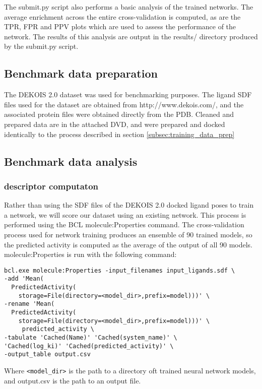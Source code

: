 The submit.py script also performs a basic analysis of the trained networks.
The average enrichment across the entire cross-validation is computed, as are the \ac{TPR}, \ac{FPR} and \ac{PPV} plots which are used to assess the performance of the network.
The results of this analysis are output in the results/ directory produced by the submit.py script.

\subsection{Benchmark data preparation}

The DEKOIS 2.0\citep{Bauer:2013de} dataset was used for benchmarking purposes.
The ligand \ac{SDF} files used for the dataset are obtained from http://www.dekois.com/, and the associated protein files were obtained directly from the \ac{PDB}. 
Cleaned and prepared data are in the attached DVD, and were prepared and docked identically to the process described in section \ref{subsec:training_data_prep}

\subsection{Benchmark data analysis}

\subsubsection{descriptor computaton}
Rather than using the \ac{SDF} files of the DEKOIS 2.0 docked ligand poses to train a network, we will score our dataset using an existing network.
This process is performed using the 
\ac{BCL} molecule:Properties command.
The cross-validation process used for network training produces an ensemble of 90 trained models, so the predicted activity is computed as the average of the output of all 90 models.
molecule:Properties is run with the following command:
\singlespace
\begin{verbatim}
bcl.exe molecule:Properties -input_filenames input_ligands.sdf \
-add 'Mean(
  PredictedActivity(
    storage=File(directory=<model_dir>,prefix=model)))' \
-rename 'Mean(
  PredictedActivity(
    storage=File(directory=<model_dir>,prefix=model)))' \
     predicted_activity \
-tabulate 'Cached(Name)' 'Cached(system_name)' \
'Cached(log_ki)' 'Cached(predicted_activity)' \
-output_table output.csv
\end{verbatim}
\doublespace
Where \texttt{<model\_dir>} is the path to a directory oft trained neural network models, and output.csv is the path to an output file.

